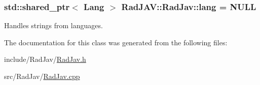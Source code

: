\subsubsection[{\texorpdfstring{lang}{lang}}]{\setlength{\rightskip}{0pt plus 5cm}std\+::shared\+\_\+ptr$<$ {\bf Lang} $>$ Rad\+J\+A\+V\+::\+Rad\+Jav\+::lang = N\+U\+LL\hspace{0.3cm}{\ttfamily [static]}}\hypertarget{class_rad_j_a_v_1_1_rad_jav_a241b8010a06fae961e78bb53353f5812}{}\label{class_rad_j_a_v_1_1_rad_jav_a241b8010a06fae961e78bb53353f5812}


Handles strings from languages. 



The documentation for this class was generated from the following files\+:\begin{DoxyCompactItemize}
\item 
include/\+Rad\+Jav/\hyperlink{_rad_jav_8h}{Rad\+Jav.\+h}\item 
src/\+Rad\+Jav/\hyperlink{_rad_jav_8cpp}{Rad\+Jav.\+cpp}\end{DoxyCompactItemize}
